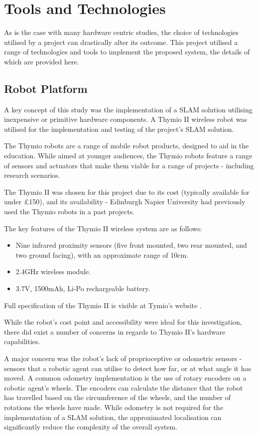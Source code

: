 \section{Tools and Technologies}
As is the case with many hardware centric studies, the choice of technologies
utilised by a project can drastically alter its outcome.
This project utilised a range of technologies and tools to implement the
proposed system, the details of which are provided here.

\subsection{Robot Platform}\label{tools_robot}
A key concept of this study was the implementation of a SLAM solution
utilising inexpensive or primitive hardware components.
A Thymio II wireless robot was utilised for the implementation and testing of
the project's SLAM solution.

The Thymio robots are a range of mobile robot products, designed to aid in the
education.
While aimed at younger audiences, the Thymio robots feature a range of
sensors and actuators that make them viable for a range of projects -
including research scenarios.

The Thymio II was chosen for this project due to its cost (typically available
for under \pounds150), and its availability  - Edinburgh Napier University had
previously used the Thymio robots in a past projects.

The key features of the Thymio II wireless system are as follows:
\begin{itemize}
\item Nine infrared proximity sensors (five front mounted, two rear mounted,
and two ground facing), with an approximate range of 10cm.
\item 2.4GHz wireless module.
\item 3.7V, 1500mAh, Li-Po rechargeable battery.
\end{itemize}
Full specification of the Thymio II is visible at Tymio's website
\cite{thymio}.

While the robot's cost point and accessibility were ideal for this
investigation, there did exist a number of concerns in regards to Thymio
II's hardware capabilities.

A major concern was the robot's lack of proprioceptive or odometric sensors -
sensors that a robotic agent can utilise to detect how far, or at what angle
it has moved.
A common odometry implementation is the use of rotary encoders on a robotic
agent's wheels.
The encoders can calculate the distance that the robot has travelled based on
the circumference of the wheels, and the number of rotations the wheels have
made.
While odometry is not required for the implementation of a SLAM solution, the
approximated localisation can significantly reduce the complexity of the
overall system.

